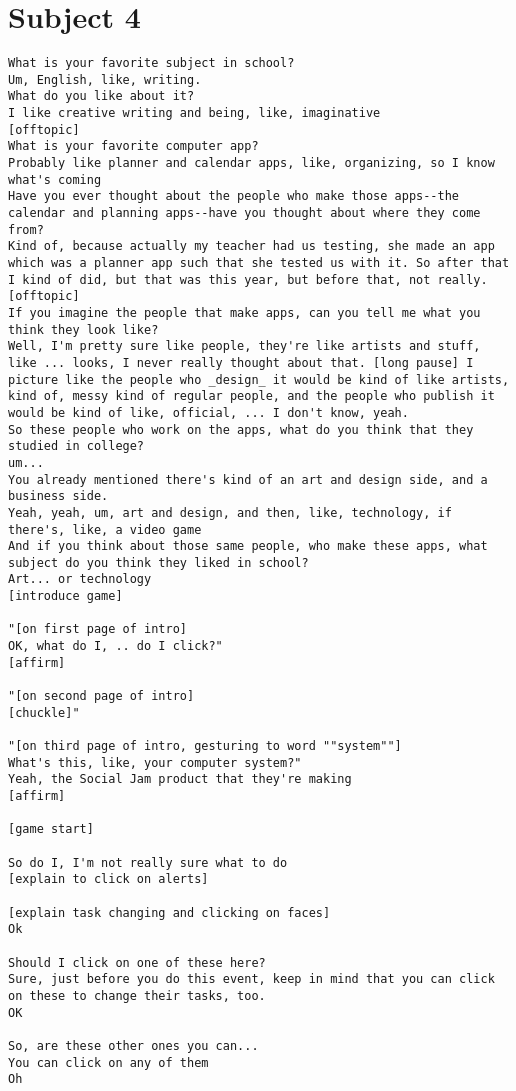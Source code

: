 \clearpage\section*{Subject 4}
\begin{lstlisting}
What is your favorite subject in school?
Um, English, like, writing. 
What do you like about it?
I like creative writing and being, like, imaginative
[offtopic]
What is your favorite computer app?
Probably like planner and calendar apps, like, organizing, so I know what's coming
Have you ever thought about the people who make those apps--the calendar and planning apps--have you thought about where they come from?
Kind of, because actually my teacher had us testing, she made an app which was a planner app such that she tested us with it. So after that I kind of did, but that was this year, but before that, not really.
[offtopic]
If you imagine the people that make apps, can you tell me what you think they look like?
Well, I'm pretty sure like people, they're like artists and stuff, like ... looks, I never really thought about that. [long pause] I picture like the people who _design_ it would be kind of like artists, kind of, messy kind of regular people, and the people who publish it would be kind of like, official, ... I don't know, yeah.
So these people who work on the apps, what do you think that they studied in college?
um...
You already mentioned there's kind of an art and design side, and a business side.
Yeah, yeah, um, art and design, and then, like, technology, if there's, like, a video game
And if you think about those same people, who make these apps, what subject do you think they liked in school?
Art... or technology
[introduce game]

"[on first page of intro]
OK, what do I, .. do I click?"
[affirm]

"[on second page of intro]
[chuckle]"

"[on third page of intro, gesturing to word ""system""]
What's this, like, your computer system?"
Yeah, the Social Jam product that they're making
[affirm]

[game start]

So do I, I'm not really sure what to do
[explain to click on alerts]

[explain task changing and clicking on faces]
Ok

Should I click on one of these here?
Sure, just before you do this event, keep in mind that you can click on these to change their tasks, too.
OK

So, are these other ones you can...
You can click on any of them
Oh


\end{lstlisting}
